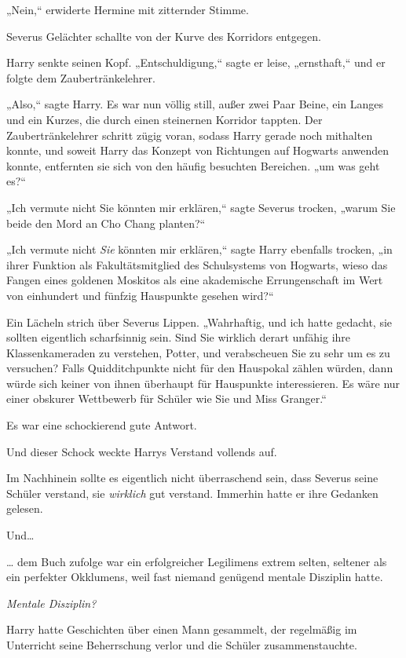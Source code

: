 {„Nein,“ erwiderte Hermine mit zitternder Stimme.

Severus Gelächter schallte von der Kurve des Korridors entgegen.

Harry senkte seinen Kopf. „Entschuldigung,“ sagte er leise, „ernsthaft,“ und er folgte dem Zaubertränkelehrer.

„Also,“ sagte Harry. Es war nun völlig still, außer zwei Paar Beine, ein Langes und ein Kurzes, die durch einen steinernen Korridor tappten. Der Zaubertränkelehrer schritt zügig voran, sodass Harry gerade noch mithalten konnte, und soweit Harry das Konzept von Richtungen auf Hogwarts anwenden konnte, entfernten sie sich von den häufig besuchten Bereichen. „um was geht es?“

„Ich vermute nicht Sie könnten mir erklären,“ sagte Severus trocken, „warum Sie beide den Mord an Cho Chang planten?“

„Ich vermute nicht \emph{Sie} könnten mir erklären,“ sagte Harry ebenfalls trocken, „in ihrer Funktion als Fakultätsmitglied des Schulsystems von Hogwarts, wieso das Fangen eines goldenen Moskitos als eine akademische Errungenschaft im Wert von einhundert und fünfzig Hauspunkte gesehen wird?“

Ein Lächeln strich über Severus Lippen. „Wahrhaftig, und ich hatte gedacht, sie sollten eigentlich scharfsinnig sein. Sind Sie wirklich derart unfähig ihre Klassenkameraden zu verstehen, Potter, und verabscheuen Sie zu sehr um es zu versuchen? Falls Quidditchpunkte nicht für den Hauspokal zählen würden, dann würde sich keiner von ihnen überhaupt für Hauspunkte interessieren. Es wäre nur einer obskurer Wettbewerb für Schüler wie Sie und Miss Granger.“

Es war eine schockierend gute Antwort.

Und dieser Schock weckte Harrys Verstand vollends auf.

Im Nachhinein sollte es eigentlich nicht überraschend sein, dass Severus seine Schüler verstand, sie \emph{wirklich} gut verstand. Immerhin hatte er ihre Gedanken gelesen.

Und…

… dem Buch zufolge war ein erfolgreicher Legilimens extrem selten, seltener als ein perfekter Okklumens, weil fast niemand genügend mentale Disziplin hatte.

\emph{Mentale Disziplin?}

Harry hatte Geschichten über einen Mann gesammelt, der regelmäßig im Unterricht seine Beherrschung verlor und die Schüler zusammenstauchte.

}
